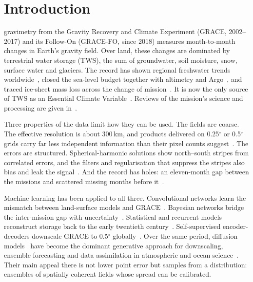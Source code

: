 \section{Introduction}
\label{sec:intro}

 gravimetry from the Gravity Recovery and Climate Experiment (GRACE, 2002--2017) and its Follow-On (GRACE-FO, since 2018) measures month-to-month changes in Earth's gravity field. Over land, these changes are dominated by terrestrial water storage (TWS), the sum of groundwater, soil moisture, snow, surface water and glaciers. The record has shown regional freshwater trends worldwide~\cite{rodell2018emerging}, closed the sea-level budget together with altimetry and Argo~\cite{loomis2019regularization}, and traced ice-sheet mass loss across the change of mission~\cite{velicogna2020continuity}. It is now the only source of TWS as an Essential Climate Variable~\cite{rodell2023water}. Reviews of the mission's science and processing are given in~\cite{chen2022applications,rodell2023water}.

Three properties of the data limit how they can be used. The fields are coarse. The effective resolution is about 300\,km, and products delivered on 0.25$^\circ$ or 0.5$^\circ$ grids carry far less independent information than their pixel counts suggest~\cite{vishwakarma2018resolution,loomis2019regularization,bonin2026ocean}. The errors are structured. Spherical-harmonic solutions show north--south stripes from correlated errors, and the filters and regularisation that suppress the stripes also bias and leak the signal~\cite{kusche2007approximate,wiese2016leakage,loomis2019regularization}. And the record has holes: an eleven-month gap between the missions and scattered missing months before it~\cite{chen2022applications,landerer2020extending}.

Machine learning has been applied to all three. Convolutional networks learn the mismatch between land-surface models and GRACE~\cite{sun2019combining}. Bayesian networks bridge the inter-mission gap with uncertainty~\cite{mo2022bayesian}. Statistical and recurrent models reconstruct storage back to the early twentieth century~\cite{humphrey2019gracerec,yin2023gtwsmlrec,palazzoli2025graice}. Self-supervised encoder-decoders downscale GRACE to 0.5$^\circ$ globally~\cite{gou2024global}. Over the same period, diffusion models~\cite{ho2020ddpm,song2021scoresde} have become the dominant generative approach for downscaling, ensemble forecasting and data assimilation in atmospheric and ocean science~\cite{mardani2025corrdiff,price2025gencast,manshausen2025genda}. Their main appeal there is not lower point error but samples from a distribution: ensembles of spatially coherent fields whose spread can be calibrated.

